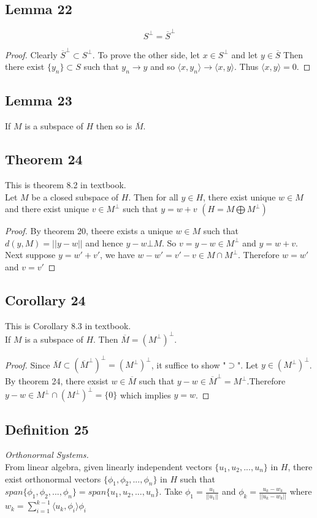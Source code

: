 \documentclass{article}
\begin{document}
\subsection*{Lemma 22}
\[
S^{\bot}=\overline{S}^{\bot}
\]
\begin{proof}
Clearly $\overline{S}^{\bot}\subset S^{\bot}$. To prove the other side, let $x\in S^{\bot}$ and let $y\in\overline{S}$ Then there exist $\{y_n\}\subset S$ such that $y_n\rightarrow y$ and so $\langle x,y_n \rangle\rightarrow\langle x,y \rangle.$ Thus $\langle x,y \rangle=0$.
\end{proof}

\subsection*{Lemma 23}
If $M$ is a subspace of $H$ then so is $\overline{M}$.

\subsection*{Theorem 24}
This is theorem 8.2 in textbook.\\
Let $M$ be a closed subspace of $H$. Then for all $y\in H$, there exist unique $w\in M$ and there exist unique $v\in M^{\bot}$ such that $y=w+v$ $(H=M\bigoplus M^{\bot})$ 
\begin{proof}
By theorem 20, theere exists a unique $w\in M$ such that $d(y,M)=||y-w||$ and hence $y-w\bot M$. So $v=y-w\in M^\bot$ and $y=w+v$. Next suppose $y=w'+v'$, we have $w-w'=v'-v\in M\cap M^\bot $. Therefore $w=w'$ and $v=v'$
\end{proof}

\subsection*{Corollary 24}
This is Corollary 8.3 in textbook.\\
If $M$ is a subspace of $H$. Then $\overline{M}=(M^\bot)^\bot$.
\begin{proof}
Since $\overline{M}\subset (\overline{M}^\bot)^\bot = (M^\bot)^\bot$, it suffice to show "$\supset$". Let $y\in (M^\bot)^\bot$. By theorem 24, there exsist $w\in \overline{M}$ such that $y-w \in \overline{M}^\bot=M^\bot$.Therefore $y-w\in M^\bot \cap (M^\bot)^\bot=\{0\}$ which implies $y=w$.
\end{proof}

\subsection*{Definition 25}
\emph{Orthonormal Systems.}\\
From linear algebra, given linearly independent vectors $\{u_1,u_2,...,u_n\}$ in $H$, there exist orthonormal vectors $\{\phi_1, \phi_2,...,\phi_n\}$ in $H$ such that $span\{\phi_1, \phi_2, ...,\phi_n\}=span\{u_1, u_2, ...,u_n\}$. Take $\phi_1=\frac{u_1}{||u_1||}$ and $\phi_k=\frac{u_k-w_k}{||u_k-w_k||}$ where $w_k=\sum_{i=1}^{k-1}\langle u_k, \phi_i \rangle \phi_i$
\end{document}
